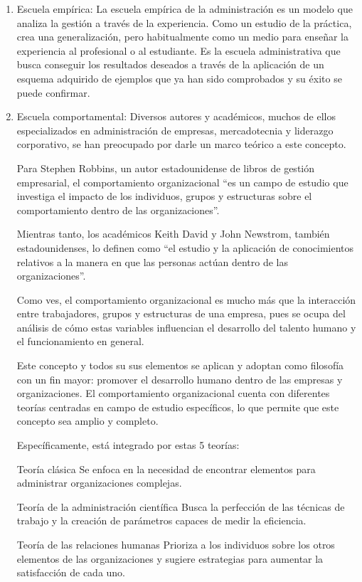 \documentclass[letterpaper,12pt]{article}
\begin{document}
\begin{sloppypar}
\begin{enumerate}
    \item Escuela empírica: La escuela  empírica  de la  administración es  un  modelo  que  analiza  la  gestión  a través de la experiencia. Como un estudio de la práctica, crea una generalización, pero habitualmente como un medio para enseñar la experiencia al profesional o al estudiante. Es la escuela administrativa que busca conseguir los resultados deseados a través de  la  aplicación  de  un  esquema  adquirido  de  ejemplos  que  ya  han  sido comprobados y su éxito se puede confirmar.
    \item Escuela comportamental: Diversos autores y académicos, muchos de ellos especializados en administración de empresas, mercadotecnia y liderazgo corporativo, se han preocupado por darle un marco teórico a este concepto.

    Para Stephen Robbins, un autor estadounidense de libros de gestión empresarial, el comportamiento organizacional “es un campo de estudio que investiga el impacto de los individuos, grupos y estructuras sobre el comportamiento dentro de las organizaciones”.
    
    Mientras tanto, los académicos Keith David y John Newstrom, también estadounidenses, lo definen como “el estudio y la aplicación de conocimientos relativos a la manera en que las personas actúan dentro de las organizaciones”.
    
    Como ves, el comportamiento organizacional es mucho más que la interacción entre trabajadores, grupos y estructuras de una empresa, pues se ocupa del análisis de cómo estas variables influencian el desarrollo del talento humano y el funcionamiento en general.
    
    Este concepto y todos su sus elementos se aplican y adoptan como filosofía con un fin mayor: promover el desarrollo humano dentro de las empresas y organizaciones.
    El comportamiento organizacional cuenta con diferentes teorías centradas en campo de estudio específicos, lo que permite que este concepto sea amplio y completo.

    Específicamente, está integrado por estas 5 teorías:

    Teoría clásica
    Se enfoca en la necesidad de encontrar elementos para administrar organizaciones complejas.

    Teoría de la administración científica
    Busca la perfección de las técnicas de trabajo y la creación de parámetros capaces de medir la eficiencia.

    Teoría de las relaciones humanas
    Prioriza a los individuos sobre los otros elementos de las organizaciones y sugiere estrategias para aumentar la satisfacción de cada uno.


\end{enumerate}
\end{sloppypar}
\end{document}
